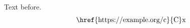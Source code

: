 \documentclass{article}
\begin{document}
Text before.
\[\vcenter{\halign{#&#\cr \href{https://example.org/c}{C}&x\cr}}\]
\end{document}
